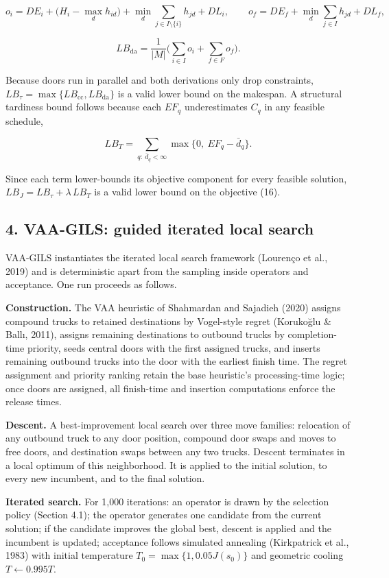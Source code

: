 \documentclass[
]{article}
\begin{document}
\[
o_i=DE_i+\Big(H_i-\max_{d}h_{id}\Big)+\min_{d}\sum_{j\in I\setminus\{i\}}h_{jd}+DL_i,\qquad
o_f=DE_f+\min_{d}\sum_{j\in I}h_{jd}+DL_f,
\]

\[
LB_{\mathrm{da}}=\frac{1}{|M|}\Big(\sum_{i\in I}o_i+\sum_{f\in F}o_f\Big). \tag{21}
\]

Because doors run in parallel and both derivations only drop
constraints, \(LB_\tau=\max\{LB_{\mathrm{cc}},LB_{\mathrm{da}}\}\) is a
valid lower bound on the makespan. A structural tardiness bound follows
because each \(EF_q\) underestimates \(C_q\) in any feasible schedule,

\[
LB_T=\sum_{q:\ \bar d_q<\infty}\max\{0,\ EF_q-\bar d_q\}. \tag{22}
\]

Since each term lower-bounds its objective component for every feasible
solution, \(LB_J=LB_\tau+\lambda\,LB_T\) is a valid lower bound on the
objective (16).

\subsection{4. VAA-GILS: guided iterated local
search}\label{vaa-gils-guided-iterated-local-search}

VAA-GILS instantiates the iterated local search framework (Lourenço et
al., 2019) and is deterministic apart from the sampling inside operators
and acceptance. One run proceeds as follows.

\textbf{Construction.} The VAA heuristic of Shahmardan and Sajadieh
(2020) assigns compound trucks to retained destinations by Vogel-style
regret (Korukoğlu \& Ballı, 2011), assigns remaining destinations to
outbound trucks by completion-time priority, seeds central doors with
the first assigned trucks, and inserts remaining outbound trucks into
the door with the earliest finish time. The regret assignment and
priority ranking retain the base heuristic's processing-time logic; once
doors are assigned, all finish-time and insertion computations enforce
the release times.

\textbf{Descent.} A best-improvement local search over three move
families: relocation of any outbound truck to any door position,
compound door swaps and moves to free doors, and destination swaps
between any two trucks. Descent terminates in a local optimum of this
neighborhood. It is applied to the initial solution, to every new
incumbent, and to the final solution.

\textbf{Iterated search.} For 1,000 iterations: an operator is drawn by
the selection policy (Section 4.1); the operator generates one candidate
from the current solution; if the candidate improves the global best,
descent is applied and the incumbent is updated; acceptance follows
simulated annealing (Kirkpatrick et al., 1983) with initial temperature
\(T_0=\max\{1,0.05J(s_0)\}\) and geometric cooling
\(T\leftarrow0.995T\).
\end{document}
